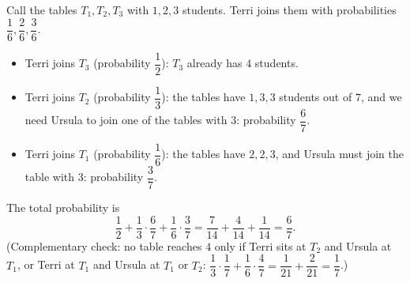 Call the tables $T_1,T_2,T_3$ with $1,2,3$ students. Terri joins them with probabilities $\dfrac{1}{6},\dfrac{2}{6},\dfrac{3}{6}$.
\begin{itemize}
\item Terri joins $T_3$ (probability $\dfrac{1}{2}$): $T_3$ already has $4$ students.
\item Terri joins $T_2$ (probability $\dfrac{1}{3}$): the tables have $1,3,3$ students out of $7$, and we need Ursula to join one of the tables with $3$: probability $\dfrac{6}{7}$.
\item Terri joins $T_1$ (probability $\dfrac{1}{6}$): the tables have $2,2,3$, and Ursula must join the table with $3$: probability $\dfrac{3}{7}$.
\end{itemize}
The total probability is
\[
\dfrac{1}{2}+\dfrac{1}{3}\cdot\dfrac{6}{7}+\dfrac{1}{6}\cdot\dfrac{3}{7}=\dfrac{7}{14}+\dfrac{4}{14}+\dfrac{1}{14}=\boxed{\dfrac{6}{7}}.
\]
(Complementary check: no table reaches $4$ only if Terri sits at $T_2$ and Ursula at $T_1$, or Terri at $T_1$ and Ursula at $T_1$ or $T_2$: $\dfrac{1}{3}\cdot\dfrac{1}{7}+\dfrac{1}{6}\cdot\dfrac{4}{7}=\dfrac{1}{21}+\dfrac{2}{21}=\dfrac{1}{7}$.)
